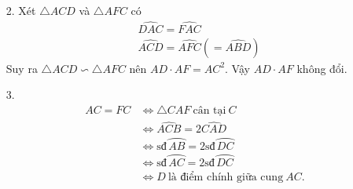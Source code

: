 \begin{bt}
{\begin{enumerate}
\begin{enumerate}
				Suy ra $\widehat{AFB}=\dfrac{\text{sđ}\,\wideparen{AB}-\text{sđ}\,\wideparen{CD}}{2}=\dfrac{\text{sđ}\,\wideparen{AC}-\text{sđ}\,\wideparen{CD}}{2}=\text{sđ}\,\wideparen{AD}=\widehat{ABD}.$ 
				\item[2.] Xét $\triangle ACD$ và $\triangle AFC$ có
				\begin{align*}
				&\widehat{DAC}=\widehat{FAC} \\
				&\widehat{ACD}=\widehat{AFC}(=\widehat{ABD})
				\end{align*}
				Suy ra $\triangle ACD\backsim \triangle AFC$ nên $AD\cdot AF=AC^2$. Vậy $AD\cdot AF$ không đổi.
				\item[3.] 
				\begin{align*}
				AC=FC &\Leftrightarrow \triangle CAF\ \text{cân tại}\  C\\
				&\Leftrightarrow\widehat{ACB}=2\widehat{CAD}\\
				&\Leftrightarrow\text{sđ}\,\wideparen{AB}=2\text{sđ}\,\wideparen{DC}\\
				&\Leftrightarrow \text{sđ}\,\wideparen{AC}=2\text{sđ}\,\wideparen{DC}\\
				&\Leftrightarrow D\  \text{là điểm chính giữa cung}\  AC.
				\end{align*}
				
			\end{enumerate}	
		\end{enumerate}
	}
\end{bt}

